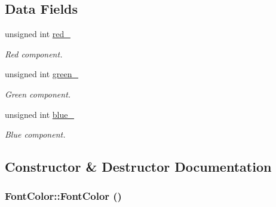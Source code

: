 \subsection*{Data Fields}
\begin{CompactItemize}
\item 
\hypertarget{struct_font_color_c81cf59116168cdf3d537680bf4ad063}{
unsigned int \hyperlink{struct_font_color_c81cf59116168cdf3d537680bf4ad063}{red\_\-}}
\label{struct_font_color_c81cf59116168cdf3d537680bf4ad063}

\begin{CompactList}\small\item\em Red component. \item\end{CompactList}\item 
\hypertarget{struct_font_color_ea3e5d5dbcd067a26062babf7b15581f}{
unsigned int \hyperlink{struct_font_color_ea3e5d5dbcd067a26062babf7b15581f}{green\_\-}}
\label{struct_font_color_ea3e5d5dbcd067a26062babf7b15581f}

\begin{CompactList}\small\item\em Green component. \item\end{CompactList}\item 
\hypertarget{struct_font_color_684ef6af13d7b54f76ade64c3b82b59b}{
unsigned int \hyperlink{struct_font_color_684ef6af13d7b54f76ade64c3b82b59b}{blue\_\-}}
\label{struct_font_color_684ef6af13d7b54f76ade64c3b82b59b}

\begin{CompactList}\small\item\em Blue component. \item\end{CompactList}\end{CompactItemize}


\subsection{Constructor \& Destructor Documentation}
\hypertarget{struct_font_color_c96e70b5ab153ea18d1e3196f79da1ab}{
\subsubsection[FontColor]{\setlength{\rightskip}{0pt plus 5cm}FontColor::FontColor ()}}
\label{struct_font_color_c96e70b5ab153ea18d1e3196f79da1ab}


